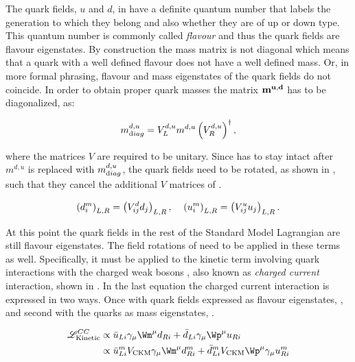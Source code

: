 The quark fields, $u$ and $d$,  in  have a definite quantum number that labels the generation to which they belong
and also whether they are of up or down type. This quantum number is commonly called {\it flavour} and thus the quark fields
are flavour eigenstates. By construction the mass matrix is not diagonal which means that
a quark with a well defined flavour does not have a well defined mass. Or, in more formal phrasing, flavour and mass eigenstates of
the quark fields do not coincide. In order to obtain proper quark masses the matrix $\bf m^{u,d}$ has to be diagonalized, as:

\begin{equation}
  \centering
  m^{d,u}_{\text diag} = V_L^{d,u} m^{d,u} \left(V_R^{d,u}\right)^{\dagger},
  \label{diagM}
\end{equation}

\noindent where the matrices $V$ are required to be unitary. Since  has to stay intact after $m^{d,u}$ is replaced with
$m^{d,u}_{\text diag}$, the quark fields need to be rotated, as shown in , such that they cancel the additional $V$ matrices
of .

\begin{equation}
  \centering
  \left( d_{i}^m \right)_{L,R} = \left( V^d_{ij} d_{j} \right)_{L,R}, \;\;\;\; \left( u_{i}^m \right)_{L,R} = \left( V^u_{ij} u_{j} \right)_{L,R}.
  \label{quark_rotation}
\end{equation}

\noindent At this point the quark fields in the rest of the Standard Model Lagrangian are still flavour eigenstates.
The field rotations of  need to be applied in these terms as well. Specifically, it must be
applied to the kinetic term involving quark interactions with the charged weak bosons \Wpm, also known as {\it charged current}
interaction, shown in . In the last equation the charged current interaction is expressed in two ways.
Once with quark fields expressed as flavour eigenstates, , and second with the quarks as mass eigenstates, .

\begin{subequations}
  \centering
  \begin{align}
    \mathscr{L}_{\text{Kinetic}}^{CC} & \propto \bar{u}_{Li} \gamma_\mu {\Wm}^\mu d_{Ri} + \bar{d}_{Li} \gamma_\mu {\Wp}^\mu u_{Ri}  \label{CClagrangianInt} \\
                                      & \propto \bar{u}_{Li}^m  {V_{\text{CKM}}} \gamma_\mu {\Wm}^\mu d_{Ri}^m + \bar{d}_{Li}^m V_{\text{CKM}} {\Wp}^\mu \gamma_\mu u_{Ri}^m \label{CClagrangianMass}
  \end{align}
  \label{CClagrangian}
\end{subequations}

